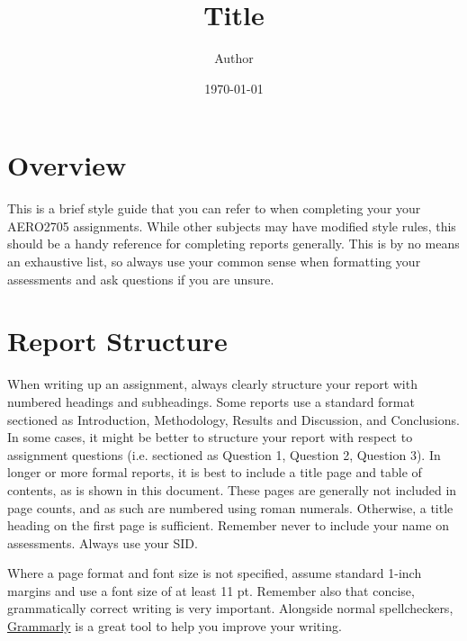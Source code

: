 \documentclass[draft,article]{UsydReport}
\title{Title}
\author{Author}
\date{\today}
\begin{document}
\frontmatter

\newpage
\tableofcontents

\newpage
\mainmatter
\section{Overview}
This is a brief style guide that you can refer to when completing your your AERO2705 assignments. While other subjects may have modified style rules, this should be a handy reference for completing reports generally. This is by no means an exhaustive list, so always use your common sense when formatting your assessments and ask questions if you are unsure.

\section{Report Structure}
When writing up an assignment, always clearly structure your report with numbered headings and subheadings. Some reports use a standard format sectioned as Introduction, Methodology,  Results and Discussion, and Conclusions. In some cases, it might be better to structure your report with respect to assignment questions (i.e. sectioned as Question 1, Question 2, Question 3). In longer or more formal reports, it is best to include a title page and table of contents, as is shown in this document. These pages are generally not included in page counts, and as such are numbered using roman numerals. Otherwise, a title heading on the first page is sufficient. Remember never to include your name on assessments. Always use your SID.

Where a page format and font size is not specified, assume standard 1-inch margins and use a font size of at least 11 pt. Remember also that concise, grammatically correct writing is very important. Alongside normal spellcheckers, \href{https://app.grammarly.com/}{Grammarly} is a great tool to help you improve your writing.
\end{document}
